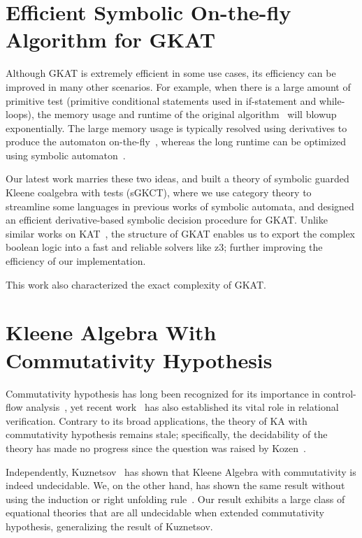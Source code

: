 \documentclass[11pt,a4paper,sans]{moderncv} %
\begin{document}
\section{Efficient Symbolic On-the-fly Algorithm for GKAT}

Although GKAT is extremely efficient in some use cases, its efficiency can be improved in many other scenarios. 
For example, when there is a large amount of primitive test (primitive conditional statements used in if-statement and while-loops), the memory usage and runtime of the original algorithm~\cite{smolka_GuardedKleeneAlgebra_2020} will blowup exponentially. 
The large memory usage is typically resolved using derivatives to produce the automaton on-the-fly~\cite{brzozowski_DerivativesRegularExpressions_1964, schmid_GuardedKleeneAlgebra_2021}, whereas the long runtime can be optimized using symbolic automaton~\cite{pous_SymbolicAlgorithmsLanguage_2015}. 

Our latest work marries these two ideas, and built a theory of symbolic guarded Kleene coalgebra with tests (sGKCT), where we use category theory to streamline some languages in previous works of symbolic automata, and designed an efficient derivative-based symbolic decision procedure for GKAT. 
Unlike similar works on KAT~\cite{pous_SymbolicAlgorithmsLanguage_2015}, the structure of GKAT enables us to export the complex boolean logic into a fast and reliable solvers like z3; further improving the efficiency of our implementation.

This work also characterized the exact complexity of GKAT.


\section{Kleene Algebra With Commutativity Hypothesis}

Commutativity hypothesis has long been recognized for its importance in control-flow analysis~\cite{kozen_KleeneAlgebraTests_1996}, yet recent work~\cite{antonopoulos_AlgebraAlignmentRelational_2023} has also established its vital role in relational verification. 
Contrary to its broad applications, the theory of KA with commutativity hypothesis remains stale; specifically, the decidability of the theory has made no progress since the question was raised by Kozen~\cite{kozen_KleeneAlgebraTests_1996}.

Independently, Kuznetsov~\cite{kuznetsov_ComplexityReasoningKleene_2023} has shown that Kleene Algebra with commutativity is indeed undecidable. We, on the other hand, has shown the same result without using the induction or right unfolding rule~\cite{azevedodeamorim_KleeneAlgebraCommutativity_2024}. 
Our result exhibits a large class of equational theories that are all undecidable when extended commutativity hypothesis, generalizing the result of Kuznetsov.
\end{document}
